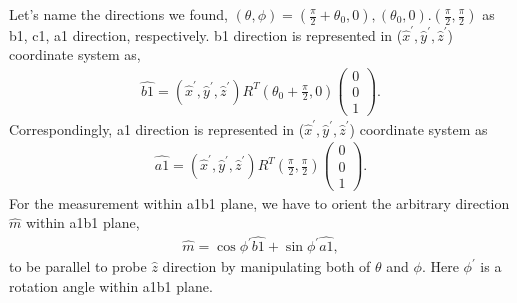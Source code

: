 Let's name the directions we found, $(\theta,\phi) = (\frac{\pi}{2}+\theta_0,0), (\theta_0,0). (\frac{\pi}{2}, \frac{\pi}{2})$ as b1, c1, a1 direction, respectively.
b1 direction is represented in ($\hat{x}^\prime, \hat{y}^\prime, \hat{z}^\prime$) coordinate system as,
\begin{align}
\widehat{b1} =
(\hat{x}^\prime, \hat{y}^\prime, \hat{z}^\prime) R^T (\theta_0 + \frac{\pi}{2}, 0)
\left(
\begin{array}{c}
0 \\
0 \\
1
\end{array}
\right).
\end{align}
Correspondingly, a1 direction is represented in ($\hat{x}^\prime, \hat{y}^\prime, \hat{z}^\prime$) coordinate system as
\begin{align}
\widehat{a1} =
(\hat{x}^\prime, \hat{y}^\prime, \hat{z}^\prime) R^T (\frac{\pi}{2}, \frac{\pi}{2})
\left(
\begin{array}{c}
0 \\
0 \\
1
\end{array}
\right).
\end{align}
For the measurement within a1b1 plane, we have to orient the arbitrary direction $\hat{m}$ within a1b1 plane,
\begin{align}
\label{m}
\hat{m} = \cos\phi^\prime\widehat{b1} + \sin\phi^\prime\widehat{a1},
\end{align}
to be parallel to probe $\hat{z}$ direction by manipulating both of $\theta$ and $\phi$.
Here $\phi^\prime$ is a rotation angle within a1b1 plane.

